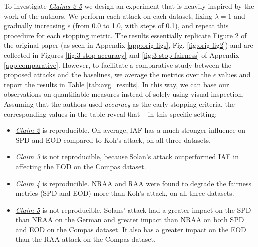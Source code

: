To investigate \hyperlink{claim-2}{\textit{Claims 2-5}} we design an experiment that is heavily inspired by the work of the authors. We perform each attack on each dataset, fixing $\lambda=1$ and gradually increasing $\epsilon$ (from 0.0 to 1.0, with steps of 0.1), and repeat this procedure for each stopping metric. The results essentially replicate Figure 2 of the original paper (as seen in Appendix \ref{app:orig-figs}, Fig. \ref{fig:orig-fig2}) and are collected in Figures \ref{fig:3-stop-accuracy} and \ref{fig:3-stop-fairness} of Appendix \ref{app:comparative}. However, to facilitate a comparative study between the proposed attacks and the baselines, we average the metrics over the $\epsilon$ values and report the results in Table \ref{tab:avg_results}. In this way, we can base our observations on quantifiable measures instead of solely using visual inspection.\\
Assuming that the authors used \textit{accuracy} as the early stopping criteria, the corresponding values in the table reveal that -- in this specific setting:
\begin{itemize}%
    \item \hyperlink{claim-2}{\textit{Claim 2}} is reproducible. On average, IAF has a much stronger influence on SPD and EOD compared to Koh's attack, on all three datasets. 
    \item \hyperlink{claim-3}{\textit{Claim 3}} is not reproducible, because Solan's attack outperformed IAF in affecting the EOD on the Compas dataset.
    \item \hyperlink{claim-4}{\textit{Claim 4}} is reproducible. NRAA and RAA were found to degrade the fairness metrics (SPD and EOD) more than Koh's attack, on all three datasets.
    \item \hyperlink{claim-5}{\textit{Claim 5}} is not reproducible. Solans' attack had a greater impact on the SPD than NRAA on the German and greater impact than NRAA on both SPD and EOD on the Compas dataset. It also has a greater impact on the EOD than the RAA attack on the Compas dataset.
\end{itemize}

